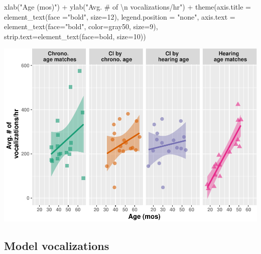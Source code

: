 \documentclass[
]{article}
\newenvironment{Shaded}{\begin{snugshade}}{\end{snugshade}}
\newcommand{\AttributeTok}[1]{\textcolor[rgb]{0.77,0.63,0.00}{#1}}
\newcommand{\DecValTok}[1]{\textcolor[rgb]{0.00,0.00,0.81}{#1}}
\newcommand{\FunctionTok}[1]{\textcolor[rgb]{0.00,0.00,0.00}{#1}}
\newcommand{\NormalTok}[1]{#1}
\newcommand{\SpecialCharTok}[1]{\textcolor[rgb]{0.00,0.00,0.00}{#1}}
\newcommand{\StringTok}[1]{\textcolor[rgb]{0.31,0.60,0.02}{#1}}
\begin{document}
\begin{Shaded}
\begin{Highlighting}[]
  \FunctionTok{xlab}\NormalTok{(}\StringTok{"Age (mos)"}\NormalTok{) }\SpecialCharTok{+}
  \FunctionTok{ylab}\NormalTok{(}\StringTok{"Avg. \# of }\SpecialCharTok{\textbackslash{}n}\StringTok{ vocalizations/hr"}\NormalTok{) }\SpecialCharTok{+} 
    \FunctionTok{theme}\NormalTok{(}\AttributeTok{axis.title =} \FunctionTok{element\_text}\NormalTok{(}\AttributeTok{face =}\StringTok{"bold"}\NormalTok{, }\AttributeTok{size=}\DecValTok{12}\NormalTok{),}
        \AttributeTok{legend.position =} \StringTok{"none"}\NormalTok{, }
        \AttributeTok{axis.text =} \FunctionTok{element\_text}\NormalTok{(}\AttributeTok{face=}\StringTok{"bold"}\NormalTok{, }\AttributeTok{color=}\StringTok{\textquotesingle{}gray50\textquotesingle{}}\NormalTok{, }\AttributeTok{size=}\DecValTok{9}\NormalTok{),}
        \AttributeTok{strip.text=}\FunctionTok{element\_text}\NormalTok{(}\AttributeTok{face=}\StringTok{\textquotesingle{}bold\textquotesingle{}}\NormalTok{, }\AttributeTok{size=}\DecValTok{10}\NormalTok{))}
\end{Highlighting}
\end{Shaded}

\includegraphics{everyday_CI_files/figure-latex/visualize age and voc quantity continuously-1.pdf}

\hypertarget{model-vocalizations}{%
\subsection{Model vocalizations}\label{model-vocalizations}}
\end{document}
